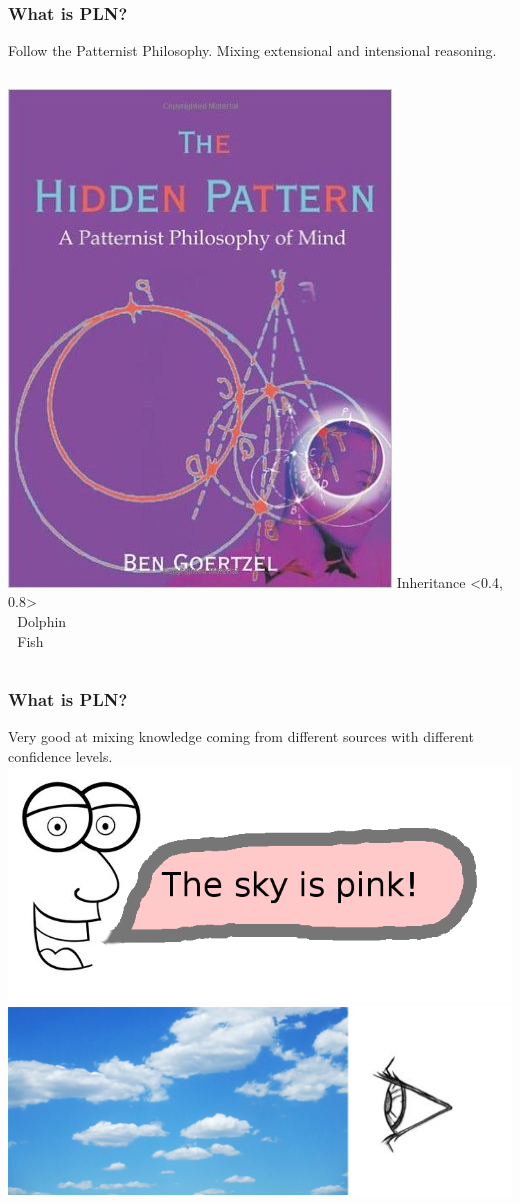 \documentclass{beamer}
\begin{document}
\frame
{
  \frametitle{What is PLN?}

  Follow the {\color{red}Patternist Philosophy}. Mixing {\color{red}extensional}
  and {\color{red}intensional} reasoning.\\
  \begin{columns}
    \column{1.5in}
    \includegraphics[scale=0.3]{pattern_philosophy.jpg}
    \column{1.5in}
    Inheritance <0.4, 0.8>\\
      $\ \ \ $Dolphin\\
      $\ \ \ $Fish
  \end{columns}
}

\frame
{
  \frametitle{What is PLN?}

  Very good at mixing knowledge coming from {\color{red}different
    sources} with {\color{red}different confidence levels}.\\[1cm]
  \includegraphics[scale=2.2]{Pink.png} \includegraphics[scale=0.11]{Blue.png}
}
\end{document}
